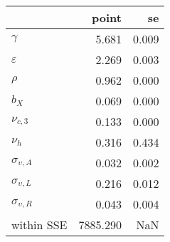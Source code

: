 \begin{tabular}{lrr}
\toprule
{} &     point &     se \\
\midrule
$\gamma$              &     5.681 &  0.009 \\
$\varepsilon$         &     2.269 &  0.003 \\
$\rho$                &     0.962 &  0.000 \\
$b_X$                 &     0.069 &  0.000 \\
$\nu_{c,3}$           &     0.133 &  0.000 \\
$\nu_{h}$             &     0.316 &  0.434 \\
$\sigma_{\upsilon,A}$ &     0.032 &  0.002 \\
$\sigma_{\upsilon,L}$ &     0.216 &  0.012 \\
$\sigma_{\upsilon,R}$ &     0.043 &  0.004 \\
within SSE            &  7885.290 &    NaN \\
\bottomrule
\end{tabular}
